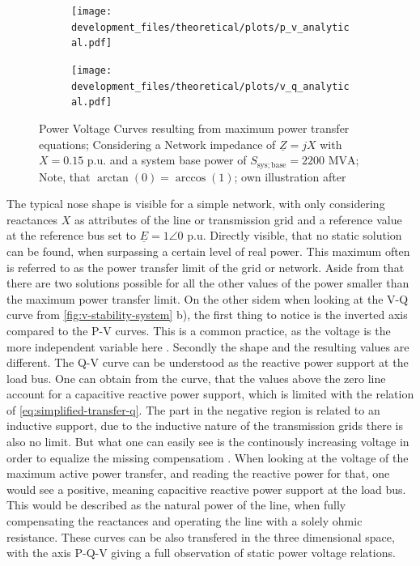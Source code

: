 \begin{figure}[htbp!]
    \centering
    \begin{subfigure}[b]{.49\linewidth}
        \texttt{[image: development\_files/theoretical/plots/p\_v\_analytical.pdf]}
    \end{subfigure}
    \begin{subfigure}[b]{.49\linewidth}
        \texttt{[image: development\_files/theoretical/plots/v\_q\_analytical.pdf]}
    \end{subfigure}
    \caption[Power Voltage Curves resulting from maximum power transfer equations]{Power Voltage Curves resulting from maximum power transfer equations; Considering a Network impedance of $\underline{Z}=jX$ with $X=0.15\text{ p.u.}$ and a system base power of $S_\mathrm{sys;base}=2200\text{ MVA}$; Note, that $\arctan(0) = \arccos(1)$; own illustration after \autocite{machowski_2020,kundur_2022,cutsem_1998}}
    \label{fig:v-stability-system}
\end{figure}

The typical nose shape is visible for a simple network, with only considering reactances $X$ as attributes of the line or transmission grid and a reference value at the reference bus set to $\underline{E}=1\angle0$ p.u.
Directly visible, that no static solution can be found, when surpassing a certain level of real power. 
This maximum often is referred to as the power transfer limit of the grid or network.
Aside from that there are two solutions possible for all the other values of the power smaller than the maximum power transfer limit.
On the other sidem when looking at the V-Q curve from \autoref{fig:v-stability-system} b), the first thing to notice is the inverted axis compared to the P-V curves.
This is a common practice, as the voltage is the more independent variable here \autocite{kundur_2022}.
Secondly the shape and the resulting values are different.
The Q-V curve can be understood as the reactive power support at the load bus.
One can obtain from the curve, that the values above the zero line account for a capacitive reactive power support, which is limited with the relation of \autoref{eq:simplified-transfer-q}.
The part in the negative region is related to an inductive support, due to the inductive nature of the transmission grids there is also no limit.
But what one can easily see is the continously increasing voltage in order to equalize the missing compensatiom \autocite{kundur_2022}.
When looking at the voltage of the maximum active power transfer, and reading the reactive power for that, one would see a positive, meaning capacitive reactive power support at the load bus.
This would be described as the natural power of the line, when fully compensating the reactances and operating the line with a solely ohmic resistance.
These curves can be also transfered in the three dimensional space, with the axis P-Q-V giving a full observation of static power voltage relations.

